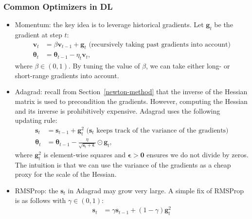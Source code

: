     \subsubsection{Common Optimizers in DL}
        \begin{itemize}
            \item Momentum: the key idea is to leverage historical gradients. Let $\bm{g}_t$ be the gradient at step $t$:
                \begin{equation}
                    \begin{aligned}
                        \bm{v}_t & = \beta  \bm{v}_{t-1} + \bm{g}_t \text{ (recursively taking past gradients into account)}\\
                        \bm{\theta}_t & = \bm{\theta}_{t-1} - \eta_t \bm{v}_t,
                    \end{aligned}
                \end{equation}
            where $\beta \in (0, 1)$. By tuning the value of $\beta$, we can take either long- or short-range gradients into account.
            \item Adagrad: recall from Section~\ref{newton-method} that the inverse of the Hessian matrix is used to precondition the gradients. 
            However, computing the Hessian and its inverse is prohibitively expensive. 
            Adagrad uses the following updating rule:
                \begin{equation}
                    \begin{aligned}
                        \bm{s}_t & = \bm{s}_{t-1} + \bm{g}_t^2  \text{ ($\bm{s}_t$ keeps track of the variance of the gradients)}\\
                        \bm{\theta}_t & = \bm{\theta}_{t-1} - \frac{\eta}{\sqrt{\bm{s}_t + \bm{\epsilon}}} \odot \bm{g}_t,
                    \end{aligned}
                \end{equation}
            where $\bm{g}_t^2$ is element-wise squares and $\bm{\epsilon} > \bm{0}$ ensures we do not divide by zeros.
            The intuition is that we can use the variance of the gradients as a cheap proxy for the scale of the Hessian. 
            \item RMSProp: the $\bm{s}_t$ in Adagrad may grow very large. A simple fix of RMSProp is as follows with $\gamma \in (0, 1)$:
                \begin{equation}
                    \begin{aligned}
                        \bm{s}_t & = \gamma \bm{s}_{t-1} + (1 - \gamma) \bm{g}_t^2  \\

\end{aligned}
\end{equation}
\end{itemize}
